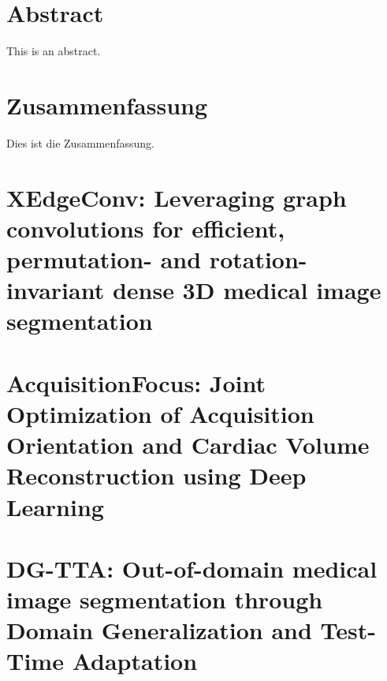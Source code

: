 \documentclass[
	11pt,
	a4paper,
	twoside,
	headsepline,
	titlepage,
	DIV=11,
	BCOR=12mm,
	captions=tableheading,
	chapterprefix=on,
	numbers=noenddot,
]{scrbook}
\begin{document}
    \thispagestyle{headings}
    

    \enlargethispage{1\baselineskip}
    \setcounter{page}{1}

    \chapter*{Abstract}
        This is an abstract.

    \chapter*{Zusammenfassung}
        Dies ist die Zusammenfassung.
    \cleardoublepage

    \tableofcontents
    \cleardoublepage

    
    
    \chapter[XEdgeConv]{XEdgeConv: Leveraging graph convolutions for efficient, permutation- and rotation-invariant dense 3D medical image segmentation}
        
    \chapter[AcquisitionFocus]{AcquisitionFocus: Joint Optimization of Acquisition Orientation and Cardiac Volume Reconstruction using Deep Learning}
        

    \chapter[DG-TTA]{DG-TTA: Out-of-domain medical image segmentation through Domain Generalization and Test-Time Adaptation}
        

    

    \printbibliography[heading=bibintoc]
\end{document}
